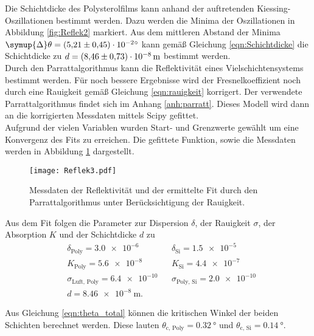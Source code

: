 Die Schichtdicke des Polysterolfilms kann anhand der auftretenden Kiessing-Oszillationen bestimmt werden. Dazu werden die Minima der Oszillationen in Abbildung \ref{fig:Reflek2}
markiert. Aus dem mittleren Abstand der Minima $\symup{\Delta}\theta = \qty{5.21 +- 0.45e-2}{\degree}$ kann gemäß Gleichung \ref{eqn:Schichtdicke} die Schichtdicke zu 
$d = \qty{8.46 +- 0.73e-8}{\metre}$ bestimmt werden.\\
Durch den Parrattalgorithmus kann die Reflektivität eines Vielschichtensystems bestimmt werden. Für noch bessere Ergebnisse wird der Fresnelkoeffizient noch durch eine 
Rauigkeit gemäß Gleichung \ref{eqn:rauigkeit} korrigert. Der verwendete Parrattalgorithmus findet sich im Anhang \ref{anh:parratt}. Dieses Modell wird dann an die korrigierten
Messdaten mittels Scipy \cite{scipy} gefittet.\\
Aufgrund der vielen Variablen wurden Start- und Grenzwerte gewählt um eine Konvergenz des Fits 
zu erreichen. Die gefittete Funktion, sowie die Messdaten werden in Abbildung \ref{fig:Reflek3} dargestellt.
\begin{figure}
    \centering
    \texttt{[image: Reflek3.pdf]}
    \caption{Messdaten der Reflektivität und der ermittelte Fit durch den Parrattalgorithmus unter Berücksichtigung der Rauigkeit.}
    \label{fig:Reflek3}
\end{figure}
Aus dem Fit folgen die Parameter zur Dispersion $\delta$, der Rauigkeit $\sigma$, der Absorption $K$ und der Schichtdicke $d$ zu
\begin{align*}
    &\delta_\text{Poly} = \num{3.0e-6} & &\delta_\text{Si} = \num{1.5e-5} \\
    &K_\text{Poly} = \num{5.6e-8} & &K_\text{Si} = \num{4.4e-7} \\
    &\sigma_\text{Luft, Poly} = \num{6.4e-10} & &\sigma_\text{Poly, Si} = \num{2.0e-10} \\
    &d = \qty{8.46e-8}{\metre}.
  \end{align*}

Aus Gleichung \ref{eqn:theta_total} können die kritischen Winkel der beiden Schichten berechnet werden. Diese lauten $\theta_\text{c, Poly} = \qty{0.32}{\degree}$ und $\theta_\text{c, Si} = \qty{0.14}{\degree}$.